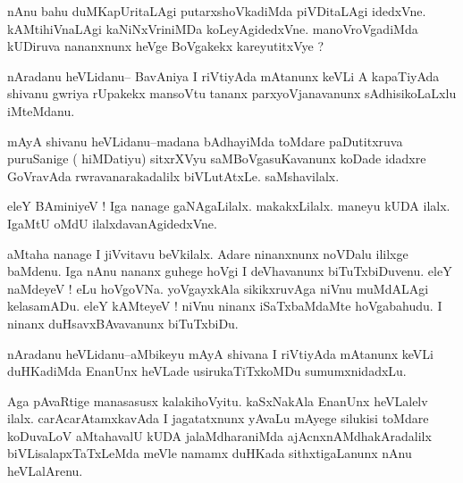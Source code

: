 \documentclass{article}
\begin{document}
\begin{mn}%
nAnu bahu duMKapUritaLAgi putarxshoVkadiMda piVDitaLAgi idedxVne. kAMtihiVnaLAgi 
kaNiNxVriniMDa koLeyAgidedxVne. manoVroVgadiMda kUDiruva nananxnunx heVge BoVgakekx 
kareyutitxVye ?
\end{mn}

\begin{mn}%
nAradanu heVLidanu-- BavAniya I riVtiyAda mAtanunx keVLi A kapaTiyAda shivanu gwriya 
rUpakekx mansoVtu tananx parxyoVjanavanunx sAdhisikoLaLxlu iMteMdanu.
\end{mn}

\begin{mn}%
mAyA shivanu heVLidanu--madana bAdhayiMda toMdare paDutitxruva puruSanige ( hiMDatiyu) 
sitxrXVyu saMBoVgasuKavanunx koDade idadxre GoVravAda rwravanarakadalilx biVLutAtxLe. 
saMshavilalx.
\end{mn}

\begin{mn}%
eleY BAminiyeV ! Iga nanage gaNAgaLilalx. makakxLilalx. maneyu kUDA ilalx. IgaMtU  oMdU 
ilalxdavanAgidedxVne.
\end{mn}

\begin{mn}%
aMtaha nanage I jiVvitavu beVkilalx. Adare ninanxnunx noVDalu ililxge baMdenu. Iga nAnu 
nananx guhege hoVgi I deVhavanunx biTuTxbiDuvenu. eleY naMdeyeV ! eLu hoVgoVNa. yoVgayxkAla 
sikikxruvAga niVnu muMdALAgi kelasamADu. eleY kAMteyeV ! niVnu ninanx iSaTxbaMdaMte 
hoVgabahudu. I ninanx duHsavxBAvavanunx biTuTxbiDu.
\end{mn}

\begin{mn}%
nAradanu heVLidanu--aMbikeyu mAyA shivana I riVtiyAda mAtanunx keVLi duHKadiMda EnanUnx 
heVLade usirukaTiTxkoMDu sumumxnidadxLu.
\end{mn}

\begin{mn}%
Aga pAvaRtige manasasusx kalakihoVyitu. kaSxNakAla EnanUnx heVLalelv ilalx. 
carAcarAtamxkavAda I jagatatxnunx yAvaLu mAyege silukisi toMdare koDuvaLoV aMtahavalU kUDA 
jalaMdharaniMda ajAcnxnAMdhakAradalilx biVLisalapxTaTxLeMda meVle namamx duHKada 
sithxtigaLanunx nAnu heVLalArenu.
\end{mn}

\end{document}
